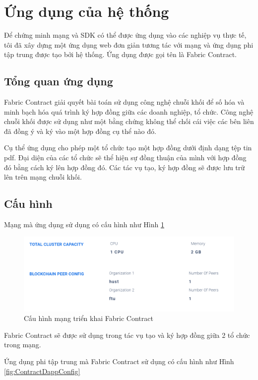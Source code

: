 \documentclass[../DoAn.tex]{subfiles}
\begin{document}
\section{Ứng dụng của hệ thống}

Để chứng minh mạng và SDK có thể được ứng dụng vào các nghiệp vụ thực tế, tôi đã xây dựng một ứng dụng web đơn giản tương tác với mạng và ứng dụng phi tập trung được tạo bởi hệ thống. Ứng dụng được gọi tên là Fabric Contract.

\subsection{Tổng quan ứng dụng}

Fabric Contract giải quyết bài toán sử dụng công nghệ chuỗi khối để số hóa và
minh bạch hóa quá trình ký hợp đồng giữa các doanh nghiệp, tổ chức. Công nghệ
chuỗi khối được sử dụng như một bằng chứng không thể chối cái việc các bên liên
đã đồng ý và ký vào một hợp đồng cụ thể nào đó.

Cụ thể ứng dụng cho phép một tổ chức tạo một hợp đồng dưới định dạng tệp tin
pdf. Đại diện của các tổ chức sẽ thể hiện sự đồng thuận của mình với hợp đồng
đó bằng cách ký lên hợp đồng đó. Các tác vụ tạo, ký hợp đồng sẽ được lưu trữ
lên trên mạng chuỗi khối.

\subsection{Cấu hình}

Mạng mà ứng dụng sử dụng có cấu hình như Hình
\ref{fig:ContractAppNetworkConfig}

\begin{figure}[H]
    \centering
    \includegraphics[width=0.75\linewidth]{Hinhve/DoAn-ContractAppNetworkConfig.png}
    \caption{Cấu hình mạng triển khai Fabric Contract}
    \label{fig:ContractAppNetworkConfig}
\end{figure}

Fabric Contract sẽ được sử dụng trong tác vụ tạo và ký hợp đồng giữa 2 tổ chức
trong mạng.

Ứng dụng phi tập trung mà Fabric Contract sử dụng có cấu hình như Hình \ref{fig:ContractDappConfig}
\end{document}
